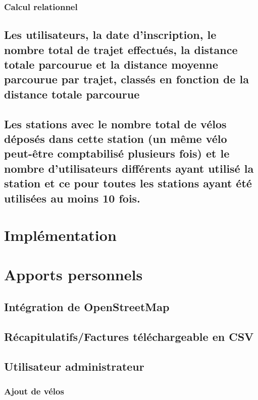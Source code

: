 \documentclass[a4paper,10pt]{article}
\begin{document}
\subsubsection{Calcul relationnel}

\subsection{Les utilisateurs, la date d'inscription, le nombre total de trajet effectués, la distance totale parcourue et la distance moyenne parcourue par trajet, classés en fonction de la distance totale parcourue}


\subsection{Les stations avec le nombre total de vélos déposés dans cette station (un même vélo peut-être comptabilisé plusieurs fois) et le nombre d'utilisateurs différents ayant utilisé la station et ce pour toutes les stations ayant été utilisées au moins 10 fois.}


\section{Implémentation}


\section{Apports personnels}

\subsection{Intégration de OpenStreetMap}

\subsection{Récapitulatifs/Factures téléchargeable en CSV} %

\subsection{Utilisateur administrateur}
\subsubsection{Ajout de vélos}
\end{document}
